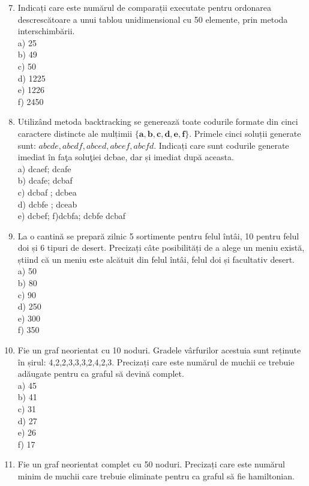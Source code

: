 \documentclass[10pt]{article}
\begin{document}
\begin{enumerate}
  \setcounter{enumi}{6}
  \item Indicați care este numărul de comparații executate pentru ordonarea descrescătoare a unui tablou unidimensional cu 50 elemente, prin metoda interschimbării.\\
a) 25\\
b) 49\\
c) 50\\
d) 1225\\
e) 1226\\
f) 2450
  \item Utilizând metoda backtracking se generează toate codurile formate din cinci caractere distincte ale mulțimii $\{\mathbf{a}, \mathbf{b}, \mathbf{c}, \mathbf{d}, \mathbf{e}, \mathbf{f}\}$. Primele cinci soluții generate sunt: $a b c d e, a b c d f, a b c e d, a b c e f, a b c f d$. Indicați care sunt codurile generate imediat în faţa soluţiei dcbae, dar și imediat după aceasta.\\
a) dcaef; dcafe\\
b) dcafe; dcbaf\\
c) dcbaf ; dcbea\\
d) dcbfe ; dceab\\
e) dcbef; f)dcbfa; dcbfe dcbaf
  \item La o cantină se prepară zilnic 5 sortimente pentru felul întâi, 10 pentru felul doi și 6 tipuri de desert. Precizați câte posibilități de a alege un meniu există, știind că un meniu este alcătuit din felul întâi, felul doi și facultativ desert.\\
a) 50\\
b) 80\\
c) 90\\
d) 250\\
e) 300\\
f) 350
  \item Fie un graf neorientat cu 10 noduri. Gradele vârfurilor acestuia sunt reținute în șirul: 4,2,2,3,3,3,2,4,2,3. Precizați care este numărul de muchii ce trebuie adăugate pentru ca graful să devină complet.\\
a) 45\\
b) 41\\
c) 31\\
d) 27\\
e) 26\\
f) 17
  \item Fie un graf neorientat complet cu 50 noduri. Precizați care este numărul minim de muchii care trebuie eliminate pentru ca graful să fie hamiltonian.\\

\end{enumerate}
\end{document}
